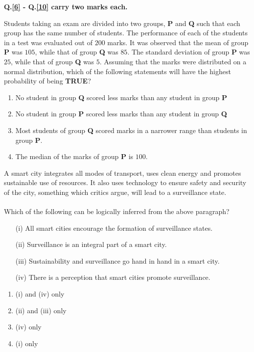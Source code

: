         \item[] \textbf{Q.\ref{6} - Q.\ref{10} carry two marks each.}
    \item \label{6} Students taking an exam are divided into two groups, \textbf{P} and \textbf{Q} such that each group has the same number of students. The performance of each of the students in a test was evaluated out of $200$ marks. It was observed that the mean of group \textbf{P} was $105$, while that of group \textbf{Q} was $85$. The standard deviation of group \textbf{P} was $25$, while that of group \textbf{Q} was $5$. Assuming that the marks were distributed on a normal distribution, which of the following statements will have the highest probability of being \textbf{TRUE}?
        \begin{enumerate}
            \item No student in group \textbf{Q} scored less marks than any student in group \textbf{P}
            \item No student in group \textbf{P} scored less marks than any student in group \textbf{Q}
            \item Most students of group \textbf{Q} scored marks in a narrower range than students in group \textbf{P}.
            \item The median of the marks of group \textbf{P} is $100$.
        \end{enumerate}

    \item A smart city integrates all modes of transport, uses clean energy and promotes sustainable use of resources. It also uses technology to ensure safety and security of the city, something which critics argue, will lead to a surveillance state. \\ \\ Which of the following can be logically inferred from the above paragraph?
        \begin{itemize}
            \item [(i)] All smart cities encourage the formation of surveillance states.
            \item [(ii)] Surveillance is an integral part of a smart city.
            \item [(iii)] Sustainability and surveillance go hand in hand in a smart city.
            \item [(iv)] There is a perception that smart cities promote surveillance.
        \end{itemize}

        \begin{enumerate}
            \item (i) and (iv) only
            \item (ii) and (iii) only
            \item (iv) only
            \item (i) only
        \end{enumerate}

